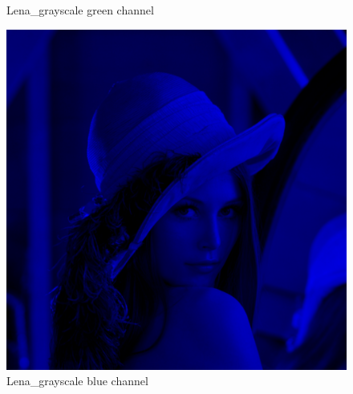 \begin{figure}[h]
\begin{minipage}{0.45\textwidth}
		\caption{Lena\_grayscale green channel}
		\label{fig:1b}
        \end{minipage}
        \hspace{0.05\textwidth}
        \begin{minipage}{0.45\textwidth}
        		\centering
		\includegraphics[width=\linewidth]{images/source/task4/2/3}
		\caption{Lena\_grayscale blue channel}
		\label{fig:1b}
        \end{minipage}
\end{figure}

